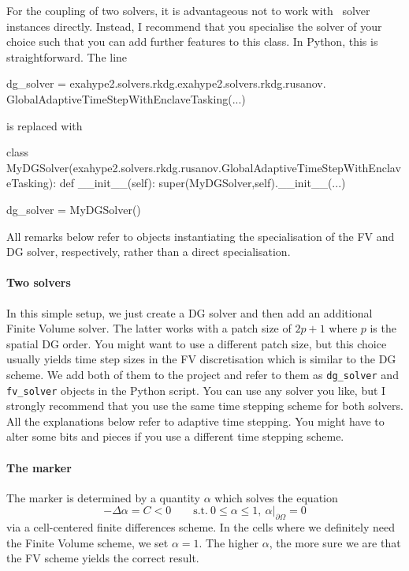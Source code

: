 \begin{remark}
 For the coupling of two solvers, it is advantageous not to work with \ExaHyPE\
 solver instances directly. Instead, I recommend that you specialise the solver
 of your choice such that you can add further features to this class. In Python,
 this is straightforward. The line
 \begin{code}
dg_solver = exahype2.solvers.rkdg.exahype2.solvers.rkdg.rusanov.
  GlobalAdaptiveTimeStepWithEnclaveTasking(...)
 \end{code}
 
 \noindent
 is replaced with 
 \begin{code}
class MyDGSolver(exahype2.solvers.rkdg.rusanov.GlobalAdaptiveTimeStepWithEnclaveTasking):
  def __init__(self):
    super(MyDGSolver,self).__init__(...)
    
dg_solver = MyDGSolver()
 \end{code}
 
 \noindent
 All remarks below refer to objects instantiating the specialisation of the FV
 and DG solver, respectively, rather than a direct specialisation.
\end{remark}



\paragraph*{Two solvers}

In this simple setup, we just create a DG solver and then add an additional
Finite Volume solver. 
The latter works with a patch size of $2p+1$ where $p$ is the spatial DG order.
You might want to use a different patch size, but this choice usually yields
time step sizes in the FV discretisation which is similar to the DG scheme.
We
add both of them to the project and refer to them as \texttt{dg\_solver} and \texttt{fv\_solver} objects in the Python script.
You can use any solver you like, but I strongly recommend that you use the same
time stepping scheme for both solvers. 
All the explanations below refer to adaptive time stepping. 
You might have to alter some bits and pieces if you use a different time
stepping scheme.

 
\paragraph*{The marker}

The marker is determined by a quantity $\alpha $ which solves the equation
\[
 - \Delta \alpha = C < 0 
 \qquad
 \text{s.t.} \ 
 0 \leq \alpha  \leq 1, \ 
 \alpha  | _{\partial \Omega} = 0
\]
via a cell-centered finite differences scheme. 
In  the cells where we definitely need the Finite Volume scheme, we set $\alpha
 = 1$.
The higher $\alpha $, the more sure we are that the FV scheme yields
the correct result.

